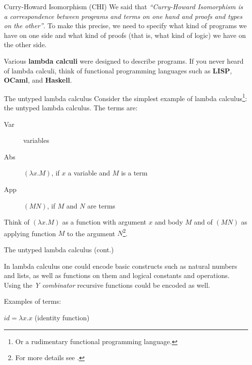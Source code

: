 \documentclass[10pt]{beamer}
\begin{document}
   \begin{frame}{Curry-Howard Isomorphism (CHI)}
     We said that {\it ``Curry-Howard Isomorphism is a correspondence between programs and terms on one hand and proofs and types on the other''}. To make this precise, we need to specify what kind of programs we have on one side and what kind of proofs (that is, what kind of logic) we have on the other side.

     Various {\bf lambda calculi} were designed to describe programs.%
     If you never heard of lambda calculi, think of functional programming languages such as {\bf LISP},  {\bf OCaml}, and {\bf Haskell}.
     
\end{frame}
\begin{frame}{The untyped lambda calculus}
    Consider the simplest example of lambda calculus\footnote{Or a rudimentary functional programming language.}: the untyped lambda calculus. The terms are:
     \begin{description}
     \item[Var] variables
     \item[Abs] $(\lambda x.M)$, if $x$ a variable and $M$ is a term 
     \item[App] $(M N)$, if $M$ and $N$ are terms
     \end{description}
     Think of $(\lambda x.M)$ as a function with argument $x$ and body $M$ and of $(M N)$ as applying function $M$ to the argument $N$\footnote{For more details see \cite{Sørensen98lectureson}.}. %

\end{frame}

\begin{frame}{The untyped lambda calculus (cont.)}
       
     In lambda calculus one could encode basic constructs such as natural numbers and lists, as well as functions on them and logical constants and operations. Using the \textit{Y combinator} recursive functions could be encoded as well.

     Examples of terms:

     $id = \lambda x.x$ (identity function)
     
\end{frame}
\end{document}
